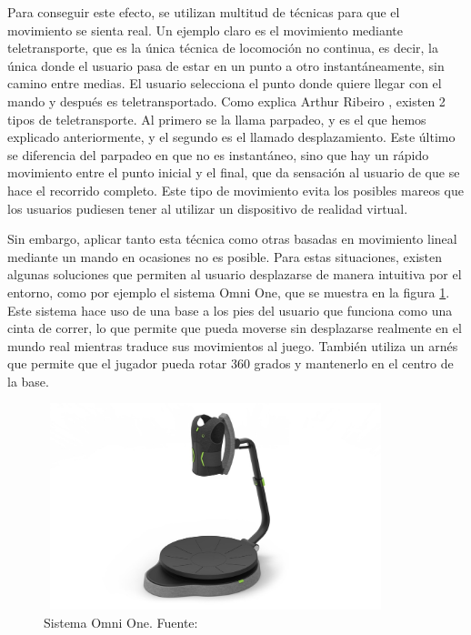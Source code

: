 \documentclass[../main.tex]{subfiles}
\begin{document}
Para conseguir este efecto, se utilizan multitud de técnicas para que el movimiento se sienta real. Un ejemplo claro es el movimiento mediante teletransporte, que es la única técnica de locomoción no continua, es decir, la única donde el usuario pasa de estar en un punto a otro instantáneamente, sin camino entre medias. El usuario selecciona el punto donde quiere llegar con el mando y después es teletransportado. Como explica Arthur Ribeiro \cite{Teletransport_Movement}, existen 2 tipos de teletransporte. Al primero se la llama parpadeo, y es el que hemos explicado anteriormente, y el segundo es el llamado desplazamiento. Este último se diferencia del parpadeo en que no es instantáneo, sino que hay un rápido movimiento entre el punto inicial y el final, que da sensación al usuario de que se hace el recorrido completo. Este tipo de movimiento evita los posibles mareos que los usuarios pudiesen tener al utilizar un dispositivo de realidad virtual.

Sin embargo, aplicar tanto esta técnica como otras basadas en movimiento lineal mediante un mando en ocasiones no es posible. Para estas situaciones, existen algunas soluciones que permiten al usuario desplazarse de manera intuitiva por el entorno, como por ejemplo el sistema Omni One, que se muestra en la figura \ref{fig:Omni_One}. Este sistema hace uso de una base a los pies del usuario que funciona como una cinta de correr, lo que permite que pueda moverse sin desplazarse realmente en el mundo real mientras traduce sus movimientos al juego. También utiliza un arnés que permite que el jugador pueda rotar 360 grados y mantenerlo en el centro de la base.

\begin{figure}[htbp]
\centering
\includegraphics[width=10cm, height= 6cm]{imagenes/Onmi_One.jpeg}
\caption{Sistema Omni One. Fuente:\cite{OmniOne}}
\label{fig:Omni_One}
\end{figure}
\end{document}
